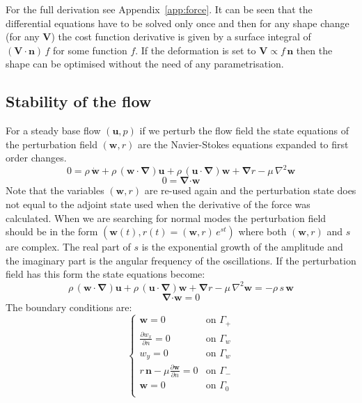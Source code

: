 \documentclass[12pt, a4paper]{article}
\begin{document}
    For the full derivation see Appendix~\ref{app:force}. It can be seen that the differential equations have to be solved only once and then for any shape change (for any $\mathbf{V}$) the cost function derivative is given by a surface integral of $(\mathbf{V \cdot n}) \, f$ for some function $f$. If the deformation is set to $\mathbf{V} \propto f\, \mathbf{n}$ then the shape can be optimised without the need of any parametrisation. 
    
    \subsection{Stability of the flow}
    For a steady base flow $(\mathbf{u},p)$ if we perturb the flow field the state equations of the perturbation field $(\mathbf{w},r)$ are the Navier-Stokes equations expanded to first order changes.
    \begin{equation}
    0 = \rho \, \mathbf{\dot{w}} + 
    \rho \, (\mathbf{w \cdot} \boldsymbol{\nabla}) \mathbf{u} + 
    \rho \, (\mathbf{u \cdot} \boldsymbol{\nabla}) \mathbf{w} + 
    \boldsymbol{\nabla} r - 
    \mu \, \nabla^2 \mathbf{w}
    \end{equation}
    \begin{equation}
    0 = \boldsymbol{\nabla} \mathbf{\cdot w}
    \end{equation}
    Note that the variables $(\mathbf{w}, r)$ are re-used again and the perturbation state does not equal to the adjoint state used when the derivative of the force was calculated. When we are searching for normal modes the perturbation field should be in the form $(\mathbf{w}(t),r(t) = (\mathbf{w},r) \, e^{st})$ where both $(\mathbf{w},r)$ and $s$ are complex. The real part of $s$ is the exponential growth of the amplitude and the imaginary part is the angular frequency of the oscillations. If the perturbation field has this form the state equations become:
    \begin{equation} \label{perturbation_1}
    \rho \, (\mathbf{w \cdot} \boldsymbol{\nabla}) \mathbf{u} + 
    \rho \, (\mathbf{u \cdot} \boldsymbol{\nabla}) \mathbf{w} + 
    \boldsymbol{\nabla} r - 
    \mu \, \nabla^2 \mathbf{w} = 
    - \rho \, s \, \mathbf{w} 
    \end{equation}
    \begin{equation} \label{perturbation_2}
    \boldsymbol{\nabla} \mathbf{\cdot w} = 0
    \end{equation}
    The boundary conditions are:
    \begin{equation} \label{perturbation_bcs}
    \begin{cases}
    \mathbf{w} = 0 & \text{on } \Gamma_+ \\
    \frac{\partial w_x}{\partial n} = 0 & \text{on } \Gamma_w \\
    w_y = 0 & \text{on } \Gamma_w \\
    r \, \mathbf{n} - \mu \frac{\partial \mathbf{w}}{\partial n} = 0 & \text{on } \Gamma_- \\
    \mathbf{w} = 0 & \text{on } \Gamma_0 \\
    \end{cases}
    \end{equation}
\end{document}
